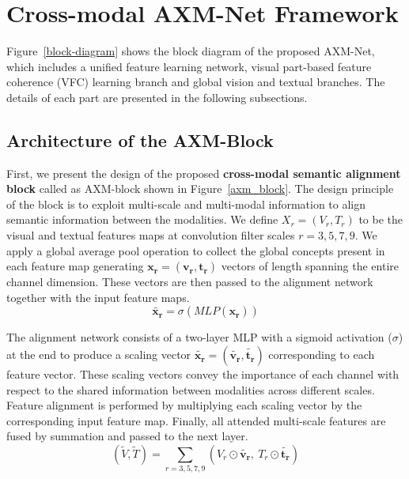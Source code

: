\documentclass[letterpaper]{article} \usepackage{aaai22}  \usepackage{times}  \usepackage{helvet}  \usepackage{courier}  \usepackage[hyphens]{url}  \usepackage{graphicx} \urlstyle{rm} \def\UrlFont{\rm}  \usepackage{natbib}  \usepackage{caption} \DeclareCaptionStyle{ruled}{labelfont=normalfont,labelsep=colon,strut=off} \frenchspacing  \setlength{\pdfpagewidth}{8.5in}  \setlength{\pdfpageheight}{11in}  \usepackage{algorithm}
\begin{document}
\section{Cross-modal AXM-Net Framework}
Figure~\ref{block-diagram} shows the block diagram of the proposed AXM-Net, which includes a unified feature learning network, visual part-based feature coherence (VFC) learning branch and global vision and textual branches. The details of each part are presented in the following subsections.
\subsection{Architecture of the AXM-Block} 
First, we present the design of the proposed \textbf{cross-modal semantic alignment block} called as AXM-block shown in Figure~\ref{axm_block}. The design principle of the block is to exploit multi-scale and multi-modal information to align semantic information between the modalities. We define $X_r=(V_r,T_r)$ to be the visual and textual features maps at convolution filter scales $r =3,5,7,9$. We apply a global average pool operation to collect the global concepts present in each feature map generating $\mathbf{x_r=(v_r,t_r)}$ vectors of length spanning the entire channel dimension. These vectors are then passed to the alignment network together with the input feature maps.
\begin{equation}
    \mathbf{\tilde{x_r}} = \sigma(MLP(\mathbf{x_r}))
\end{equation}

The alignment network consists of a two-layer MLP with a sigmoid activation ($\sigma$) at the end to produce a scaling vector $\mathbf{{\tilde{x_r}=(\tilde{v_r},\tilde{t_r})}}$ corresponding to each feature vector. These scaling vectors convey the importance of each channel with respect to the shared information between modalities across different scales. Feature alignment is performed by multiplying each scaling vector by the corresponding input feature map. Finally, all attended multi-scale features are fused by summation and passed to the next layer.
\begin{equation}
    (\tilde{V}, \tilde{T}) = \sum_{r=3,5,7,9} (V_r \odot \mathbf{\tilde{v_r}},\  T_r \odot \mathbf{\tilde{t_r}} )
\end{equation}
\end{document}
